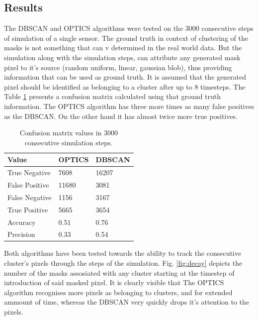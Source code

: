  \subsection{Results}


The DBSCAN and OPTICS algorithms were tested on the 3000 consecutive steps of simulation of a single sensor.
The ground truth in context of clustering of the masks is not something that can v determined in the real world data.
But the simulation along with the simulation steps, can attribute any generated mask pixel to it's source (random uniform, linear, gaussian blob), thus providing information that can be used as ground truth.
It is assumed that the generated pixel should be identified as belonging to a cluster after up to 8 timesteps.
The Table \ref{sample-table} presents a confusion matrix calculated using that ground truth information. The OPTICS algorithm has three more times as many false positives as the DBSCAN. On the other hand it has almost twice more true positives.


\begin{table}[H]
  \caption{Confusion matrix values in 3000 consecutive simulation steps.}
  \label{sample-table}
  \centering
  \begin{tabular}{lll}


    \toprule
    Value     & OPTICS     & DBSCAN \\
    \midrule
    True Negative & 7608 & 16207 \\
    False Positive    & 11680 & 3081      \\
    False Negative     & 1156       & 3167  \\
    True Positive &  5665 &   3654   \\
    \midrule
    Accuracy &  0.51 &   0.76   \\
    Precision &  0.33 &   0.54   \\
    \bottomrule

  \end{tabular}
\end{table}

Both algorithms have been tested towards the ability to track the consecutive cluster's pixels through the steps of the simulation. Fig. \ref{fig:decay} depicts the number of the masks assosiated with any cluster starting at the timestep of introduction of said masked pixel. It is clearly visible that The OPTICS algorithm recognises more pixels as belonging to clusters, and for extended ammount of time, whereas the DBSCAN very quickly drops it's attention to the pixels.

